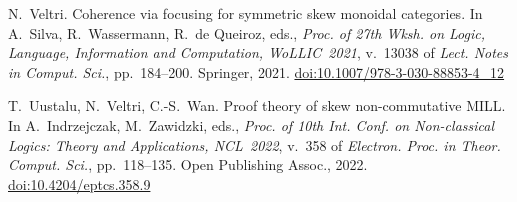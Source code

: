 \documentclass{article}
\newcommand{\doi}[1]{\href{https://doi.org/#1}{doi:#1}}
\begin{document}
\begin{thebibliography}{99}
 N.~Veltri. Coherence via focusing for symmetric skew
  monoidal categories. In A.~Silva, R.~Wassermann, R.~de Queiroz,
  eds., \emph{Proc. of 27th Wksh. on Logic, Language, Information and
    Computation, WoLLIC~2021}, v.~13038 of \emph{Lect. Notes in
    Comput. Sci.}, pp.~184--200. Springer, 2021.
\doi{10.1007/978-3-030-88853-4\_12}

 T.~Uustalu, N.~Veltri, C.-S.~Wan. Proof theory of skew
  non-commutative MILL. In A.~Indrzejczak, \linebreak M.~Zawidzki,
  eds., \emph{Proc. of 10th Int. Conf. on Non-classical Logics: Theory
    and Applications, NCL~2022}, v.~358 of \emph{Electron. Proc. in
    Theor. Comput. Sci.}, pp.~118--135. Open Publishing Assoc., 2022.
\doi{10.4204/eptcs.358.9}

\end{thebibliography}
\end{document}
